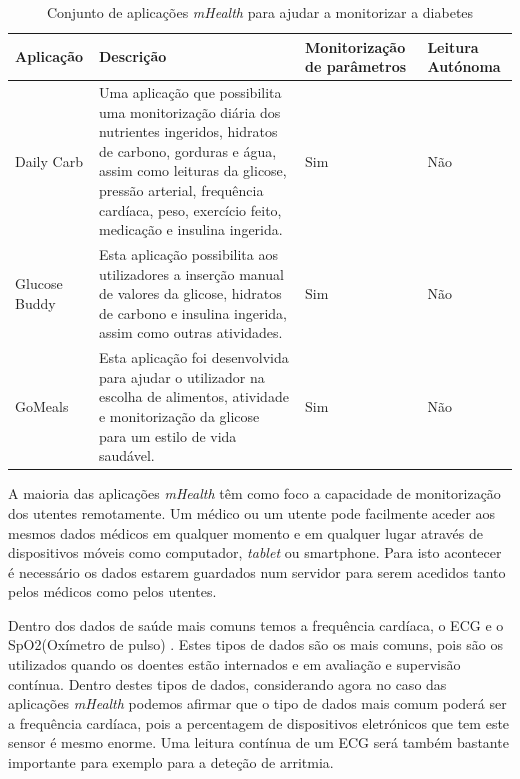 \begin{table}[H]
\centering

\begin{tabularx}{1\textwidth}{|p{3cm}|p{6.1cm}|p{2.7cm}|p{2cm}|}
\rowcolor[HTML]{FFCE93} \hline
\textbf{Aplicação} &  \textbf{Descrição} &  \textbf{Monitorização de parâmetros}  &  \textbf{Leitura Autónoma}  \\
\hline
Daily Carb \cite{mhealth_app1} & Uma aplica\c c\~ao que possibilita uma monitoriza\c c\~ao di\'aria dos nutrientes ingeridos, hidratos de carbono, gorduras e \'agua, assim como leituras da glicose, press\~ao arterial, frequ\^encia card\'iaca, peso, exerc\'icio feito, medica\c c\~ao e insulina ingerida. & Sim & Não \\ \hline

Glucose Buddy \cite{mhealth_app2} & Esta aplica\c c\~ao possibilita aos utilizadores a inser\c c\~ao manual de valores da glicose, hidratos de carbono e insulina ingerida, assim como outras atividades. & Sim & Não \\ \hline
GoMeals \cite{mhealth_app3} & Esta aplica\c c\~ao foi desenvolvida para ajudar o utilizador na escolha de alimentos, atividade e monitoriza\c c\~ao da glicose  para um  estilo de vida saud\'avel. & Sim & Não \\ \hline
\end{tabularx}

\caption{Conjunto de aplicações \textit{mHealth} para ajudar a monitorizar a diabetes}
\label{t:aplications-glicose}
\end{table}

A maioria das aplica\c c\~oes \textit{mHealth} t\^em como foco a capacidade de monitoriza\c c\~ao dos utentes remotamente. Um m\'edico ou um utente pode facilmente aceder aos mesmos dados m\'edicos em qualquer momento e em qualquer lugar atrav\'es de dispositivos m\'oveis como computador, \textit{tablet} ou smartphone. Para isto acontecer é necessário os dados estarem guardados num servidor para serem acedidos tanto pelos médicos como pelos utentes.

Dentro dos dados de saúde mais comuns temos a frequência cardíaca, o \gls{ECG} e o SpO2(Oxímetro de pulso) \cite{wearable-trends}. Estes tipos de dados são os mais comuns, pois são os utilizados quando os doentes estão internados e em avaliação e supervisão contínua.
Dentro destes tipos de dados, considerando agora no caso das aplicações \textit{mHealth} podemos afirmar que o tipo de dados mais comum poderá ser a frequência cardíaca, pois a percentagem de dispositivos eletrónicos que tem este sensor é mesmo enorme. Uma leitura contínua de um \gls{ECG} será também bastante importante para exemplo para a deteção de arritmia.



